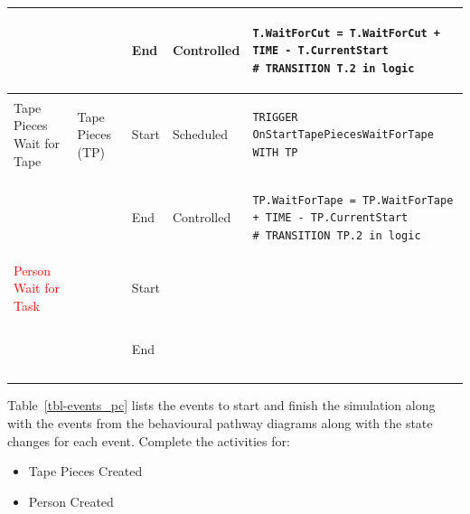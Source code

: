\documentclass[
  10pt,
  a4paperpaper,
  DIV=11,
  numbers=noendperiod,
  oneside]{scrreprt}
\providecommand{\tightlist}{%
  \setlength{\itemsep}{0pt}\setlength{\parskip}{0pt}}\usepackage{longtable,booktabs,array}
\begin{document}
\begin{longtable}{@{}>{\raggedright\arraybackslash}p{1.8cm}>{\raggedright\arraybackslash}p{2.1cm}>{\raggedright\arraybackslash}p{0.9cm}>{\raggedright\arraybackslash}p{2.2cm}>{\raggedright\arraybackslash}p{8.75cm}@{}}
  &                                                          & End   & Controlled & 
\begin{lstlisting}[language=CMPseudo]
T.WaitForCut = T.WaitForCut + TIME - T.CurrentStart
# TRANSITION T.2 in logic
\end{lstlisting}             \\ \midrule
  Tape Pieces Wait for Tape & Tape Pieces (TP)                       & Start & Scheduled  & 
\begin{lstlisting}[language=CMPseudo]
TRIGGER OnStartTapePiecesWaitForTape WITH TP
\end{lstlisting}             \\
  &                                                          & End   & Controlled & 
\begin{lstlisting}[language=CMPseudo]
TP.WaitForTape = TP.WaitForTape + TIME - TP.CurrentStart
# TRANSITION TP.2 in logic
\end{lstlisting}             \\ \midrule
\textcolor{Red}{Person Wait for Task}      &     & Start &   & 
\begin{lstlisting}[language=CMPseudo]
 
\end{lstlisting}             \\
  &                                                          & End   &  & 
\begin{lstlisting}[language=CMPseudo]
 
 
\end{lstlisting}             \\ \bottomrule
  

\end{longtable}

Table~\ref{tbl-events_pc} lists the events to start and finish the
simulation along with the events from the behavioural pathway diagrams
along with the state changes for each event. Complete the activities
for:

\begin{itemize}
\tightlist
\item
  Tape Pieces Created
\item
  Person Created
\end{itemize}
\end{document}
